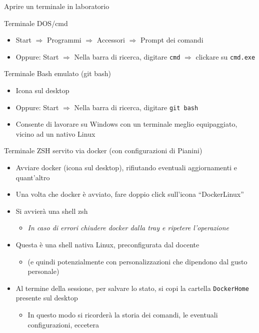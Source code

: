 \documentclass[xcolor=dvipsnames,presentation]{beamer}
\begin{document}
\begin{frame}{Aprire un terminale in laboratorio}
    \begin{block}{Terminale DOS/cmd}
        \begin{itemize}
            \item Start $\Rightarrow$ Programmi $\Rightarrow$ Accessori $\Rightarrow$ Prompt dei comandi
            \item Oppure: Start  $\Rightarrow$ Nella barra di ricerca, digitare \texttt{cmd} $\Rightarrow$ clickare su \texttt{cmd.exe}
        \end{itemize}
    \end{block}
    \begin{block}{Terminale Bash emulato (git bash)}
        \begin{itemize}
            \item Icona sul desktop
            \item Oppure: Start  $\Rightarrow$ Nella barra di ricerca, digitare \texttt{git bash}
            \item Consente di lavorare su Windows con un terminale meglio equipaggiato, vicino ad un nativo Linux
        \end{itemize}
    \end{block}
    \begin{block}{Terminale ZSH servito via docker (con configurazioni di Pianini)}
        \begin{itemize}
            \item Avviare docker (icona sul desktop), rifiutando eventuali aggiornamenti e quant'altro
            \item Una volta che docker è avviato, fare doppio click sull'icona ``DockerLinux''
            \item Si avvierà una shell zsh
            \begin{itemize}
                \item \emph{In caso di errori chiudere docker dalla tray e ripetere l'operazione}
            \end{itemize}
            \item Questa è una shell nativa Linux, preconfigurata dal docente
            \begin{itemize}
                \item (e quindi potenzialmente con personalizzazioni che dipendono dal gusto personale)
            \end{itemize}
            \item Al termine della sessione, per salvare lo stato, si copi la cartella \texttt{DockerHome} presente sul desktop
            \begin{itemize}
                \item In questo modo si ricorderà la storia dei comandi, le eventuali configurazioni, eccetera
            \end{itemize}
        \end{itemize}
    \end{block}
\end{frame}
\end{document}

